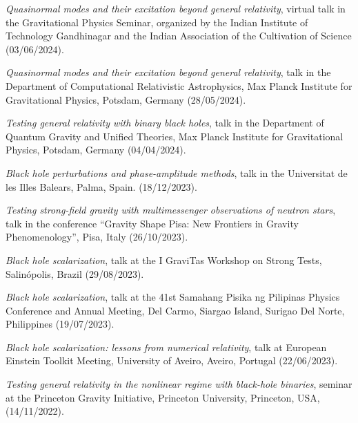 \documentclass[11pt]{article}
\begin{document}
\begin{etaremune}[topsep=0pt,partopsep=0pt]
    \item \emph{Quasinormal modes and their excitation beyond general relativity},
    virtual talk in the Gravitational Physics Seminar, organized by the Indian Institute of Technology Gandhinagar and the Indian Association of the Cultivation of Science
    \hfill (03/06/2024).

    \item \emph{Quasinormal modes and their excitation beyond general relativity},
    talk in the Department of Computational Relativistic Astrophysics, Max Planck Institute for Gravitational Physics, Potsdam, Germany
    \hfill (28/05/2024).

    \item \emph{Testing general relativity with binary black holes},
    talk in the Department of Quantum Gravity and Unified Theories, Max Planck Institute for Gravitational Physics, Potsdam, Germany
    \hfill (04/04/2024).

    \item \emph{Black hole perturbations and phase-amplitude methods},
    talk in the Universitat de les Illes Balears, Palma, Spain.
    \hfill (18/12/2023).

    \item \emph{Testing strong-field gravity with multimessenger observations of neutron stars},
    talk in the conference ``Gravity Shape Pisa: New Frontiers in Gravity Phenomenology'',
    Pisa, Italy
    \hfill (26/10/2023).

    \item \emph{Black hole scalarization},
    talk at the I GraviTas Workshop on Strong Tests, Salin\'opolis, Brazil
    \hfill (29/08/2023).

    \item \emph{Black hole scalarization},
    talk at the 41st Samahang Pisika ng Pilipinas Physics Conference and Annual Meeting, Del Carmo, Siargao Island, Surigao Del Norte, Philippines
    \hfill (19/07/2023).

    \item \emph{Black hole scalarization: lessons from numerical relativity},
    talk at European Einstein Toolkit Meeting, University of Aveiro, Aveiro, Portugal
    \hfill (22/06/2023).

    \item
    \emph{Testing general relativity in the nonlinear regime with black-hole binaries},
    seminar at the Princeton Gravity Initiative, Princeton University, Princeton, USA,
    (14/11/2022).


\end{etaremune}
\end{document}
